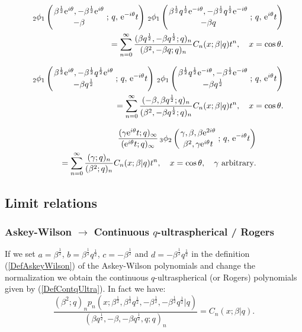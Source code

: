 \documentclass[envcountchap,graybox]{svmono}
\newcommand{\qhyp}[5]{\mbox{}_{#1}{\phi}_{#2}
\left(\genfrac{}{}{0pt}{}{#3}{#4}\,;\,q,\,#5\right)}
\newcommand{\e}{\textrm{e}}
\newcommand{\qhyp}[5]{\,\mbox{}_{#1}\phi_{#2}\!\left(
  \genfrac{}{}{0pt}{}{#3}{#4};#5\right)}
\begin{document}
\begin{eqnarray}
\label{GenContqUltra5}
& &\qhyp{2}{1}{\beta^{\frac{1}{2}}\e^{i\theta},
-\beta^{\frac{1}{2}}\e^{i\theta}}{-\beta}{\e^{-i\theta}t}\,
\qhyp{2}{1}{\beta^{\frac{1}{2}}q^{\frac{1}{2}}\e^{-i\theta},
-\beta^{\frac{1}{2}}q^{\frac{1}{2}}\e^{-i\theta}}{-\beta q}{\e^{i\theta}t}\nonumber\\
& &{}=\sum_{n=0}^{\infty}\frac{(\beta q^{\frac{1}{2}},-\beta q^{\frac{1}{2}};q)_n}
{(\beta^2,-\beta q;q)_n}C_n(x;\beta|q)t^n,\quad x=\cos\theta.
\end{eqnarray}

\begin{eqnarray}
\label{GenContqUltra6}
& &\qhyp{2}{1}{\beta^{\frac{1}{2}}\e^{i\theta},
-\beta^{\frac{1}{2}}q^{\frac{1}{2}}\e^{i\theta}}{-\beta q^{\frac{1}{2}}}{\e^{-i\theta}t}\,
\qhyp{2}{1}{\beta^{\frac{1}{2}}q^{\frac{1}{2}}\e^{-i\theta},
-\beta^{\frac{1}{2}}\e^{-i\theta}}{-\beta q^{\frac{1}{2}}}{\e^{i\theta}t}\nonumber\\
& &{}=\sum_{n=0}^{\infty}\frac{(-\beta,\beta q^{\frac{1}{2}};q)_n}
{(\beta^2,-\beta q^{\frac{1}{2}};q)_n}C_n(x;\beta|q)t^n,\quad x=\cos\theta.
\end{eqnarray}

\begin{eqnarray}
\label{GenContqUltra7}
& &\frac{(\gamma\e^{i\theta}t;q)_{\infty}}{(\e^{i\theta}t;q)_{\infty}}\,
\qhyp{3}{2}{\gamma,\beta,\beta\e^{2i\theta}}{\beta^2,\gamma\e^{i\theta}t}{\e^{-i\theta}t}\nonumber\\
& &{}=\sum_{n=0}^{\infty}\frac{(\gamma;q)_n}{(\beta^2;q)_n}C_n(x;\beta|q)t^n,
\quad x=\cos\theta,\quad\textrm{$\gamma$ arbitrary}.
\end{eqnarray}

\subsection*{Limit relations}

\subsubsection*{Askey-Wilson $\rightarrow$ Continuous $q$-ultraspherical / Rogers}
If we set $a=\beta^{\frac{1}{2}}$, $b=\beta^{\frac{1}{2}}q^{\frac{1}{2}}$,
$c=-\beta^{\frac{1}{2}}$ and $d=-\beta^{\frac{1}{2}}q^{\frac{1}{2}}$ in the definition
(\ref{DefAskeyWilson}) of the Askey-Wilson polynomials and change the
normalization we obtain the continuous $q$-ultraspherical (or Rogers)
polynomials given by (\ref{DefContqUltra}). In fact we have:
$$\frac{(\beta^2;q)_np_n(x;\beta^{\frac{1}{2}},\beta^{\frac{1}{2}}q^{\frac{1}{2}},
-\beta^{\frac{1}{2}},-\beta^{\frac{1}{2}}q^{\frac{1}{2}}|q)}
{(\beta q^{\frac{1}{2}},-\beta,-\beta q^{\frac{1}{2}},q;q)_n}=C_n(x;\beta|q).$$
\end{document}
